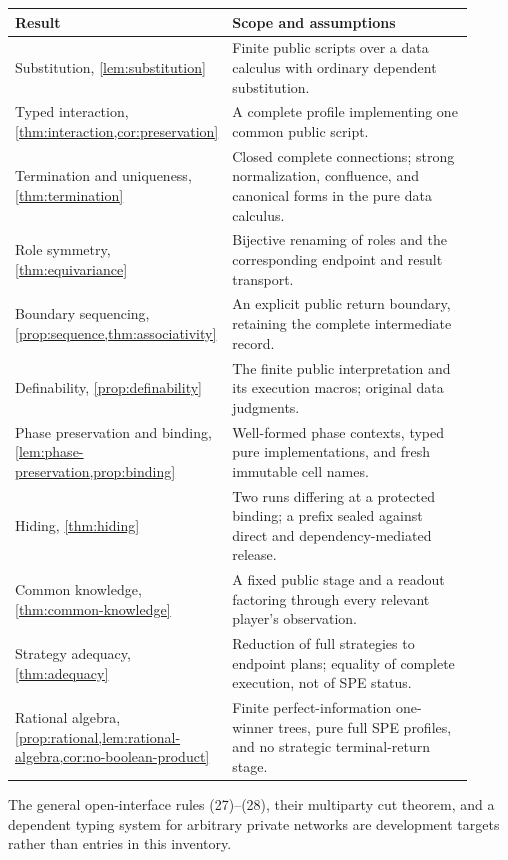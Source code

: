 \begin{center}
\small
\begin{tabular}{>{\raggedright\arraybackslash}p{0.35\linewidth}>{\raggedright\arraybackslash}p{0.56\linewidth}}
\toprule
Result & Scope and assumptions\\
\midrule
Substitution, \cref{lem:substitution} & Finite public scripts over a data
calculus with ordinary dependent substitution.\\[3pt]
Typed interaction, \cref{thm:interaction,cor:preservation} & A complete
profile implementing one common public script.\\[3pt]
Termination and uniqueness, \cref{thm:termination} & Closed complete
connections; strong normalization, confluence, and canonical forms in the
pure data calculus.\\[3pt]
Role symmetry, \cref{thm:equivariance} & Bijective renaming of roles and the
corresponding endpoint and result transport.\\[3pt]
Boundary sequencing, \cref{prop:sequence,thm:associativity} & An explicit
public return boundary, retaining the complete intermediate record.\\[3pt]
Definability, \cref{prop:definability} & The finite public interpretation and
its execution macros; original data judgments.\\[3pt]
Phase preservation and binding,
\cref{lem:phase-preservation,prop:binding} & Well-formed phase contexts,
typed pure implementations, and fresh immutable cell names.\\[3pt]
Hiding, \cref{thm:hiding} & Two runs differing at a protected binding;
a prefix sealed against direct and dependency-mediated release.\\[3pt]
Common knowledge, \cref{thm:common-knowledge} & A fixed public stage and a
readout factoring through every relevant player's observation.\\[3pt]
Strategy adequacy, \cref{thm:adequacy} & Reduction of full strategies to
endpoint plans; equality of complete execution, not of SPE status.\\[3pt]
Rational algebra, \cref{prop:rational,lem:rational-algebra,cor:no-boolean-product}
& Finite perfect-information one-winner trees, pure full SPE profiles,
and no strategic terminal-return stage.\\
\bottomrule
\end{tabular}
\end{center}

The general open-interface rules (27)--(28), their multiparty cut theorem,
and a dependent typing system for arbitrary private networks are development
targets rather than entries in this inventory.
